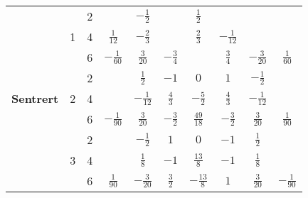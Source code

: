 \begin{table}[H]
\begin{tabular}{|c|c|c|c|c|c|c|c|c|c|}
    \multirow{12}{*}{\textbf{\footnotesize{Sentrert}}}
                                                      & \multirow{3}{*}{1}           & 2                           &                  & $-\frac{1}{2}$   &                 & $\frac{1}{2}$    &                   &                    &                  \\ \cline{3-10}
                                                      &                              & 4                           & $\frac{1}{12}$   & $-\frac{2}{3}$   &                 & $\frac{2}{3}$    & $-\frac{1}{12}$   &                    &                  \\ \cline{3-10}
                                                      &                              & 6                           & $-\frac{1}{60}$  & $\frac{3}{20}$   & $-\frac{3}{4}$  &                  & $\frac{3}{4}$     & $-\frac{3}{20}$    & $\frac{1}{60}$   \\ \cline{2-10}
                                                      & \multirow{3}{*}{2}           & 2                           &                  & $\frac{1}{2}$    & $-1$            & $0$              & $1$               & $-\frac{1}{2}$     &                  \\ \cline{3-10}
                                                      &                              & 4                           &                  & $-\frac{1}{12}$  & $\frac{4}{3}$   & $-\frac{5}{2}$   & $\frac{4}{3}$     & $-\frac{1}{12}$    &                  \\ \cline{3-10}
                                                      &                              & 6                           & $-\frac{1}{90}$  & $\frac{3}{20}$   & $-\frac{3}{2}$  & $\frac{49}{18}$  & $-\frac{3}{2}$    & $\frac{3}{20}$     & $\frac{1}{90}$   \\ \cline{2-10}
                                                      & \multirow{3}{*}{3}           & 2                           &                  & $-\frac{1}{2}$   & $1$             & $0$              & $-1$              & $\frac{1}{2}$      &                  \\ \cline{3-10}
                                                      &                              & 4                           &                  & $\frac{1}{8}$    & $-1$            & $\frac{13}{8}$   & $-1$              & $\frac{1}{8}$      &                  \\ \cline{3-10}
                                                      &                              & 6                           & $\frac{1}{90}$   & $-\frac{3}{20}$  & $\frac{3}{2}$   & $-\frac{13}{8}$  & $1$               & $\frac{3}{20}$     & $-\frac{1}{90}$  \\ \cline{2-10}

\end{tabular}
\end{table}
